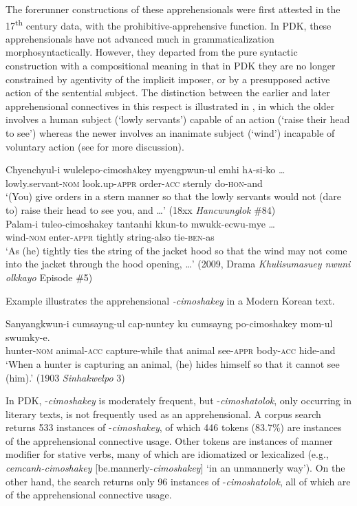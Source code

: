 \documentclass[output=paper,colorlinks,citecolor=brown]{langscibook}
\begin{document}
The forerunner constructions of these apprehensionals were first attested in the 17\textsuperscript{th} century data, with the prohibitive-apprehensive function. In PDK, these apprehensionals have not advanced much in grammaticalization morphosyntactically. However, they departed from the pure syntactic construction with a com\-positional meaning in that in PDK they are no longer constrained by agentivity of the implicit imposer, or by a presupposed active action of the sentential subject. The distinction between the earlier and later apprehensional connectives in this respect is illustrated in , in which the older  involves a human subject (`lowly servants') capable of an action (`raise their head to see') whereas the newer  involves an inanimate subject (`wind') incapable of voluntary action (see  for more discussion).


\ea \label{ex:RK13}
\ea \label{ex:RK13a}
\gll Chyenchyul-i wulelepo-cimosh\textsc{a}key myengpwun-ul emhi h\textsc{a}-si-ko …\\
lowly.servant-\textsc{nom} look.up-\textsc{appr} order-\textsc{acc} sternly do-\textsc{hon}-and \\
\glt `(You) give orders in a stern manner so that the lowly servants would not (dare to) raise their head to see you, and …' (18xx \textit{Hancwunglok} \#84)\\
\ex \label{ex:RK13b}
\gll Palam-i tuleo-cimoshakey tantanhi kkun-to mwukk-ecwu-mye …\\
wind-\textsc{nom} enter-\textsc{appr} tightly string-also tie-\textsc{ben}-as\\
\glt `As (he) tightly ties the string of the jacket hood so that the wind may not come into the jacket through the hood opening,  …' (2009, Drama \textit{Khulisumasuey nwuni olkkayo} Episode \#5)
\z
\z

 Example  illustrates the apprehensional \textit{-cimoshakey} in a Modern Korean text.


\ea \label{ex:RK14}
\gll Sanyangkwun-i cumsayng-ul cap-nuntey ku cumsayng po-cimoshakey mom-ul swumky-e. \\
hunter-\textsc{nom} animal-\textsc{acc} capture-while that animal see-\textsc{appr} body-\textsc{acc} hide-and \\
\glt `When a hunter is capturing an animal, (he) hides himself so that it cannot see (him).' (1903 \textit{Sinhakwelpo} 3)
\z

 In PDK, \nobreakdash-\textit{cimoshakey} is moderately frequent, but \nobreakdash-\textit{cimoshatolok}, only occurring in literary texts, is not frequently used as an apprehensional. A corpus search returns 533 instances of \nobreakdash-\textit{cimoshakey}, of which 446 tokens (83.7\%) are instances of the apprehensional connective usage. Other tokens are instances of manner modifier for stative verbs, many of which are idiomatized or lexicalized (e.g., \textit{cemcanh-cimoshakey} [be.mannerly-\textit{cimoshakey}] `in an unmannerly way'). On the other hand, the search returns only 96 instances of \nobreakdash-\textit{cimoshatolok}, all of which are of the apprehensional connective usage.
\end{document}
